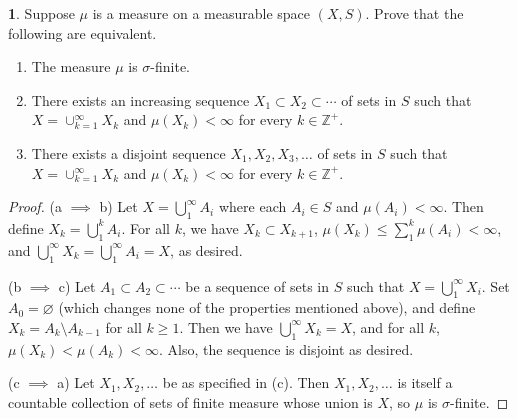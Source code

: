 \documentclass[12pt]{article}
\theoremstyle{definition}
\newtheorem{ex}{}
\newenvironment{exercise}[1]{
	\renewcommand{\theex}{#1}
	\begin{ex}
		}{\end{ex}}
\begin{document}
\begin{exercise}{5A.8}
	Suppose $\mu$ is a measure on a measurable space $(X, S)$.
	Prove that the following are equivalent.
	\begin{enumerate}[label=(\alph*)]
		\item The measure $\mu$ is $\sigma$-finite.
		\item There exists an increasing sequence $X_1 \subset X_2 \subset \cdots$ of sets in $S$ such that $X = \cup_{k=1}^\infty X_k$ and $\mu(X_k) < \infty$ for every $k \in \mathbb{Z}^+$.
		\item There exists a disjoint sequence $X_1, X_2, X_3, \dots$ of sets in $S$ such that $X = \cup_{k=1}^\infty X_k$ and $\mu(X_k) < \infty$ for every $k \in \mathbb{Z}^+$.
	\end{enumerate}
\end{exercise}
\begin{proof}
	(a $\implies$ b)
	Let $X = \bigcup_1^\infty A_i$ where each $A_i \in S$ and $\mu(A_i) < \infty$.
	Then define $X_k = \bigcup_1^k A_i$.
	For all $k$, we have $X_k \subset X_{k+1}$, $\mu(X_k) \leq \sum_1^k \mu(A_i) < \infty$, and $\bigcup_1^\infty X_k = \bigcup_1^\infty A_i = X$, as desired.

	(b $\implies$ c)
	Let $A_1 \subset A_2 \subset \cdots$ be a sequence of sets in $S$ such that $X = \bigcup_1^\infty X_i$.
	Set $A_0 = \varnothing$ (which changes none of the properties mentioned above), and define $X_k = A_{k} \setminus A_{k-1}$ for all $k \geq 1$.
	Then we have $\bigcup_1^\infty X_k = X$, and for all $k$, $\mu(X_k) < \mu(A_k) < \infty$.
	Also, the sequence is disjoint as desired.

	(c $\implies$ a)
	Let $X_1, X_2, \dots$ be as specified in (c).
	Then $X_1, X_2, \dots$ is itself a countable collection of sets of finite measure whose union is $X$, so $\mu$ is $\sigma$-finite.
\end{proof}
\end{document}
